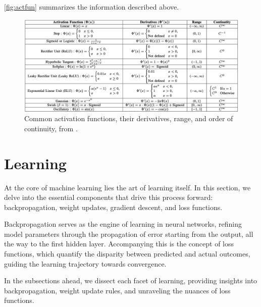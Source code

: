 \documentclass{article}
\begin{document}
\autoref{fig:actfun} summarizes the information described above.
\begin{figure}[]
  \includegraphics{ActFunTable}
  \caption{Common activation functions, their derivatives, range, and order of continuity, from \cite{jagtap2022important}.}
\label{fig:actfun}
\end{figure}

\section{Learning}
  \label{sec:Learning}
  At the core of machine learning lies the art of learning itself. In this section, we delve into the essential components that drive this process forward: backpropagation, weight updates, gradient descent, and loss functions.

Backpropagation serves as the engine of learning in neural networks, refining model parameters through the propagation of error starting from the output, all the way to the first hidden layer. Accompanying this is the concept of loss functions, which quantify the disparity between predicted and actual outcomes, guiding the learning trajectory towards convergence.

In the subsections ahead, we dissect each facet of learning, providing insights into backpropagation, weight update rules, and unraveling the nuances of loss functions.
  
\end{document}
